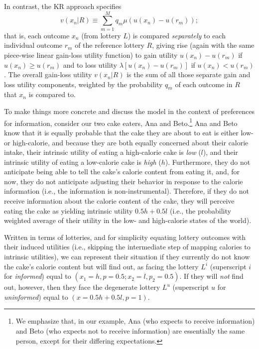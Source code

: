In contrast, the KR approach specifies
\begin{equation*}
  v(x_n|R) \equiv \sum_{m=1}^M q_m \mu (u(x_n)-u(r_m));
\end{equation*}
that is, each outcome $x_n$ (from lottery $L$) is compared \emph{separately} to each individual outcome $r_m$ of the reference lottery $R$, giving rise (again with the same piece-wise linear gain-loss utility function) to gain utility $u(x_n)-u(r_m)$ if $u(x_n) \geq u(r_m)$ and to loss utility $\lambda [u(x_n)-u(r_m)]$ if $u(x_n)<u(r_m)$. The overall gain-loss utility $v(x_n|R)$ is the sum of all those separate gain and loss utility components, weighted by the probability $q_m$ of each outcome in $R$ that $x_n$ is compared to.

To make things more concrete and discuss the model in the context of preferences for information, consider our two cake eaters, Ana and Beto.\footnote{We emphasize that, in our example, Ana (who expects to receive information) and Beto (who expects not to receive information) are essentially the same person, except for their differing expectations.} Ana and Beto know that it is equally probable that the cake they are about to eat is either low- or high-calorie, and because they are both equally concerned about their calorie intake, their intrinsic utility of eating a high-calorie cake is \emph{low} ($l$), and their intrinsic utility of eating a low-calorie cake is \emph{high} ($h$). Furthermore, they do not anticipate being able to tell the cake’s calorie content from eating it, and, for now, they do not anticipate adjusting their behavior in response to the calorie information (i.e., the information is non-instrumental). Therefore, if they do not receive information about the calorie content of the cake, they will perceive eating the cake as yielding intrinsic utility $0.5h+0.5l$ (i.e., the probability weighted average of their utility in the low- and high-calorie states of the world).

Written in terms of lotteries, and for simplicity equating lottery outcomes with their induced utilities (i.e., skipping the intermediate step of mapping calories to intrinsic utilities), we can represent their situation if they currently do not know the cake's calorie content but will find out, as facing the lottery $L^i$ (superscript $i$ for \emph{informed}) equal to $(x_1=h,p=0.5;x_2=l,p_2=0.5)$. If they will \emph{not} find out, however, then they face the degenerate lottery $L^u$ (superscript $u$ for \emph{uninformed}) equal to $(x=0.5h+0.5l,p=1)$.

